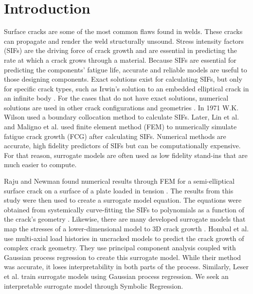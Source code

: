 
\chapter{Introduction}\label{introduction}

Surface cracks are some of the most common flaws found in welds. These cracks can propagate and render the weld structurally unsound. Stress intensity factors (SIFs) are the driving force of crack growth and are essential in predicting the rate at which a crack grows through a material. Because SIFs are essential for predicting the components' fatigue life, accurate and reliable models are useful to those designing components. Exact solutions exist for calculating SIFs, but only for specific crack types, such as Irwin’s solution to an embedded elliptical crack in an infinite body \cite{tada2000stress}. For the cases that do not have exact solutions, numerical solutions are used in other crack configurations and geometries \cite{wilson1971numerical,lin1999finite,maligno2010three}. In 1971 W.K. Wilson used a boundary collocation method to calculate SIFs. Later, Lin et al. and Maligno et al. used finite element method (FEM) to numerically simulate fatigue crack growth (FCG) after calculating SIFs. Numerical methods are accurate, high fidelity predictors of SIFs but can be computationally expensive. For that reason, surrogate models are often used as low fidelity stand-ins that are much easier to compute.

Raju and Newman found numerical results through FEM for a semi-elliptical surface crack on a surface of a plate loaded in tension \cite{raju1979stress}. The results from this study were then used to create a surrogate model equation. The equations were obtained from systemically curve-fitting the SIFs to polynomials as a function of the crack's geometry \cite{newman1983stress}. Likewise, there are many developed surrogate models that map the stresses of a lower-dimensional model to 3D crack growth \cite{hombal2013surrogate,leser2016probabilistic,leser2017probabilistic}. Hombal et al. use multi-axial load histories in uncracked models to predict the crack growth of complex crack geometry. They use principal component analysis coupled with Gaussian process regression to create this surrogate model. While their method was accurate, it loses interpretability in both parts of the process. Similarly, Leser et al. train surrogate models using Gaussian process regression. We seek an interpretable surrogate model through Symbolic Regression. 

